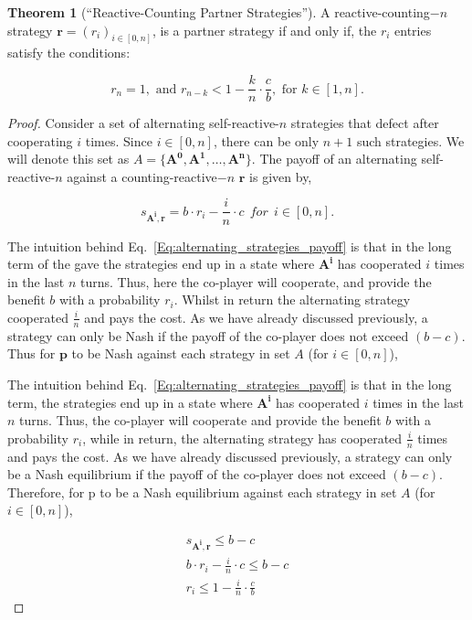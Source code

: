 \documentclass{article}
\theoremstyle{definition}
\newtheorem{theorem}{Theorem}[section]
\begin{document}
\begin{theorem}[``Reactive-Counting Partner Strategies'']
A reactive-counting$-n$ strategy $\mathbf{r}=(r_i)_{i \in [0, n]}$,
is a partner strategy if and only if, the $r_i$ entries satisfy the conditions:

\begin{equation}
  r_{n} = 1, \text{ and  } r_{n - k} < 1 - \frac{k}{n} \cdot \frac{c}{b}, \text{ for } k \in [1, n].
\end{equation}

\begin{proof}
Consider a set of alternating self-reactive-$n$ strategies that defect after
cooperating $i$ times. Since $i \in [0, n]$, there can be only $n + 1$ such
strategies. We will denote this set as $A = \{\mathbf{A^{0}}, \mathbf{A^{1}}, \dots,
\mathbf{A^{n}} \}$.
The payoff of an alternating self-reactive-$n$ against a counting-reactive$-n$
$\mathbf{r}$ is given by,

\begin{equation}\label{Eq:alternating_strategies_payoff}
  s_{\mathbf{A^{i}}, \mathbf{r}} = b \cdot r_i - \frac{i}{n} \cdot c ~~for~~ i \in [0, n].
\end{equation}

The intuition behind Eq.~\eqref{Eq:alternating_strategies_payoff} is that in the
long term of the gave the strategies end up in a state where $\mathbf{A^{i}}$
has cooperated $i$ times in the last $n$ turns. Thus, here the co-player
will cooperate, and provide the benefit $b$ with a probability $r_i$. Whilst in
return the alternating strategy cooperated $\frac{i}{n}$ and pays the cost.
As we have already discussed previously, a strategy can only be Nash if the
payoff of the co-player does not exceed $(b - c)$. Thus for $\mathbf{p}$ to be Nash
against each strategy in set $A$ (for $i \in [0, n]$),

The intuition behind  Eq.~\eqref{Eq:alternating_strategies_payoff} is that in
the long term, the strategies end up in a state where $\mathbf{A^{i}}$ has cooperated $i$ times
in the last $n$ turns. Thus, the co-player will cooperate and provide the benefit
$b$ with a probability $r_i$, while in return, the alternating strategy has
cooperated $\frac{i}{n}$ times and pays the cost. As we have already discussed previously,
a strategy can only be a Nash equilibrium if the payoff of the co-player does
not exceed $(b - c)$. Therefore, for p to be a Nash equilibrium against each
strategy in set $A$ (for $i \in [0, n]$),

\begin{align}\label{eq:NashConditionDonationGameCounting}
  s_{\mathbf{A^{i}}, \mathbf{r}} \leq b - c \\ 
  b \cdot r_i - \frac{i}{n} \cdot c \leq   b - c \\
  r_i \leq 1 - \frac{i}{n} \cdot \frac{c}{b}
\end{align}


\end{proof}
\end{theorem}
\end{document}
